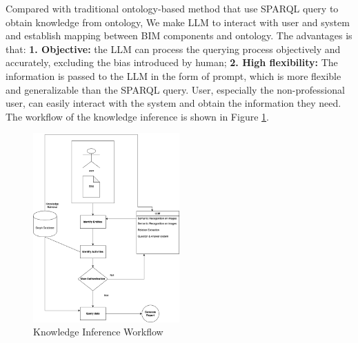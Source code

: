 Compared with traditional ontology-based method that use SPARQL query to obtain knowledge from ontology,
We make LLM to interact with user and system and establish mapping between BIM components and ontology. 
The advantages is that: \textbf{1. Objective: } the LLM can process the querying process objectively and accurately,
excluding the bias introduced by human; \textbf{2. High flexibility: } 
The information is passed to the LLM in the form of prompt, which is more flexible and generalizable than the SPARQL query.
User, especially the non-professional user, can easily interact with the system and obtain the information they need.
The workflow of the knowledge inference is shown in Figure \ref{fig:knowledge_inference_workflow}.
\begin{figure}
    \label{fig:knowledge_inference_workflow}
    \centering
    \includegraphics[width=0.5\textwidth]{figures/qa system.png}
    \caption{Knowledge Inference Workflow}
\end{figure}
